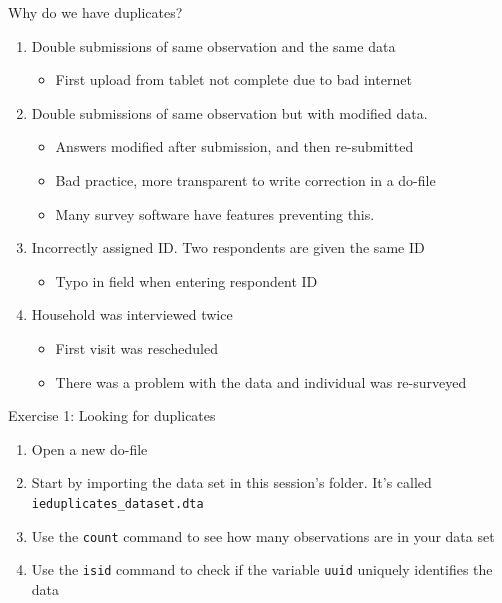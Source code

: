\documentclass[aspectratio=169]{beamer}
\begin{document}
\begin{frame}{Why do we have duplicates?}
    \begin{enumerate}
        \item Double submissions of same observation and the same data
         \begin{itemize}
            \item First upload from tablet not complete due to bad internet
        \end{itemize}
        \item Double submissions of same observation but with modified data.
         \begin{itemize}
            \item Answers modified after submission, and then re-submitted
            \item Bad practice, more transparent to write correction in a do-file
            \item Many survey software have features preventing this.
        \end{itemize}
        \item Incorrectly assigned ID. Two respondents are given the same ID
         \begin{itemize}
            \item Typo in field when entering respondent ID
        \end{itemize}
        \item Household was interviewed twice
        \begin{itemize}
            \item First visit was rescheduled
            \item There was a problem with the data and individual was re-surveyed
        \end{itemize}
    \end{enumerate}   
\end{frame}

\begin{frame}{Exercise 1: Looking for duplicates}
    \begin{enumerate}
        \item Open a new do-file
        \item Start by importing the data set in this session's folder. It's called \texttt{ieduplicates\_dataset.dta}
        \item Use the \texttt{count} command to see how many observations are in your data set
        \item Use the \texttt{isid} command to check if the variable \texttt{uuid} uniquely identifies the data
    \end{enumerate}
\end{frame}
\end{document}

